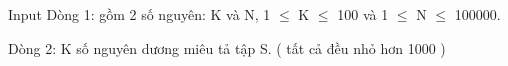 Input
Dòng 1: gồm 2 số nguyên: K và N, 1  $\le$  K  $\le$  100 và 1  $\le$  N  $\le$  100000.

Dòng 2: K số nguyên dương miêu tả tập S. ( tất cả đều nhỏ hơn 1000 )